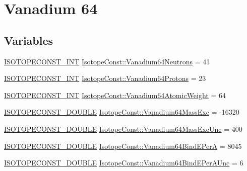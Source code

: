 \hypertarget{group___isotope_const-_vanadium-_v64}{}\section{Vanadium 64}
\label{group___isotope_const-_vanadium-_v64}
\subsection*{Variables}
\begin{DoxyCompactItemize}
\item 
\mbox{\hyperlink{group___isotope_const-_macros_ga5f18360b3e99483a35c32d789e62621c}{I\+S\+O\+T\+O\+P\+E\+C\+O\+N\+S\+T\+\_\+\+I\+NT}} \mbox{\hyperlink{group___isotope_const-_vanadium-_v64_gab1f1337e29b62df3031cb55c61d9ebd9}{Isotope\+Const\+::\+Vanadium64\+Neutrons}} = 41
\item 
\mbox{\hyperlink{group___isotope_const-_macros_ga5f18360b3e99483a35c32d789e62621c}{I\+S\+O\+T\+O\+P\+E\+C\+O\+N\+S\+T\+\_\+\+I\+NT}} \mbox{\hyperlink{group___isotope_const-_vanadium-_v64_gaebf12f3da0e0484de50c8ccd6e954303}{Isotope\+Const\+::\+Vanadium64\+Protons}} = 23
\item 
\mbox{\hyperlink{group___isotope_const-_macros_ga5f18360b3e99483a35c32d789e62621c}{I\+S\+O\+T\+O\+P\+E\+C\+O\+N\+S\+T\+\_\+\+I\+NT}} \mbox{\hyperlink{group___isotope_const-_vanadium-_v64_ga5ca6e07f32d3bd4a676526d1de71ed28}{Isotope\+Const\+::\+Vanadium64\+Atomic\+Weight}} = 64
\item 
\mbox{\hyperlink{group___isotope_const-_macros_ga8f45a7272ce02c0b4c65c44636ed719a}{I\+S\+O\+T\+O\+P\+E\+C\+O\+N\+S\+T\+\_\+\+D\+O\+U\+B\+LE}} \mbox{\hyperlink{group___isotope_const-_vanadium-_v64_gaa7d27e464d5fdec6dbed4b38db96a9c3}{Isotope\+Const\+::\+Vanadium64\+Mass\+Exc}} = -\/16320
\item 
\mbox{\hyperlink{group___isotope_const-_macros_ga8f45a7272ce02c0b4c65c44636ed719a}{I\+S\+O\+T\+O\+P\+E\+C\+O\+N\+S\+T\+\_\+\+D\+O\+U\+B\+LE}} \mbox{\hyperlink{group___isotope_const-_vanadium-_v64_gabc3f1a086e260177cc125963d6e20d59}{Isotope\+Const\+::\+Vanadium64\+Mass\+Exc\+Unc}} = 400
\item 
\mbox{\hyperlink{group___isotope_const-_macros_ga8f45a7272ce02c0b4c65c44636ed719a}{I\+S\+O\+T\+O\+P\+E\+C\+O\+N\+S\+T\+\_\+\+D\+O\+U\+B\+LE}} \mbox{\hyperlink{group___isotope_const-_vanadium-_v64_ga81bb55fd54e5ecd3915b2482f042601c}{Isotope\+Const\+::\+Vanadium64\+Bind\+E\+PerA}} = 8045
\item 
\mbox{\hyperlink{group___isotope_const-_macros_ga8f45a7272ce02c0b4c65c44636ed719a}{I\+S\+O\+T\+O\+P\+E\+C\+O\+N\+S\+T\+\_\+\+D\+O\+U\+B\+LE}} \mbox{\hyperlink{group___isotope_const-_vanadium-_v64_ga6ce69d60a97bdf134add0449c64cbcd0}{Isotope\+Const\+::\+Vanadium64\+Bind\+E\+Per\+A\+Unc}} = 6

\end{DoxyCompactItemize}
